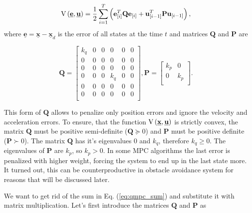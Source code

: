 \documentclass[a4paper,11pt,titlepage]{article}
\newcommand{\uvec}{\textbf{\underline{u}}}
\begin{document}
\begin{equation}
\label{eq:qmpc_sum}
\mathrm{V}\left(\textbf{\underline{e}}, \uvec\right) = \frac{1}{2}\sum_{i=1}^{T}\left(\textbf{e}^T_{[i]}\textbf{Q}\textbf{e}_{[i]} + \textbf{u}^T_{[i-1]}\textbf{P}\textbf{u}_{[i-1]}\right),
\end{equation}
where $\underline{\textbf{e}} = \underline{\textbf{x}} - \underline{\textbf{x}}_d$ is the error of all states at the time $t$  and matrices $\textbf{Q}$ and $\textbf{P}$ are

\begin{equation}
\label{eq:qmpc_weighting_matrices_simple}
\textbf{Q} = \begin{bmatrix}
k_q & 0 & 0 & 0 & 0 & 0 \\
0 & 0 & 0 & 0 & 0 & 0 \\
0 & 0 & 0 & 0 & 0 & 0 \\
0 & 0 & 0 & k_q & 0 & 0 \\
0 & 0 & 0 & 0 & 0 & 0 \\
0 & 0 & 0 & 0 & 0 & 0 \\
\end{bmatrix}, 
\textbf{P} = \begin{bmatrix}
k_p & 0\\
0 & k_p\\
\end{bmatrix}.
\end{equation}

This form of $\textbf{Q}$ allows to penalize only position errors and ignore the velocity and acceleration errors. To ensure, that the function $\mathrm{V}\left(\textbf{\underline{x}}, \uvec\right)$ is strictly convex, the matrix $\textbf{Q}$ must be positive semi-definite ($\textbf{Q} \succeq 0$) and $\textbf{P}$ must be positive definite ($\textbf{P} \succ 0$). The matrix $\textbf{Q}$ has it's eigenvalues $0$ and $k_q$, therefore $k_q \geq 0$. The eigenvalues of $\textbf{P}$ are $k_p$, so $k_p > 0$. In some MPC algorithms the last error is penalized with higher weight, forcing the system to end up in the last state more. It turned out, this can be counterproductive in obstacle avoidance system for reasons that will be discussed later.

We want to get rid of the sum in Eq. (\ref{eq:qmpc_sum}) and substitute it with matrix multiplication. Let's first introduce the matrices $\textbf{\^Q}$ and $\textbf{\^P}$ as 
\end{document}
